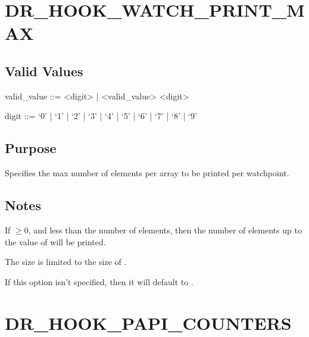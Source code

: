 \documentclass[letterpaper,10pt,english]{sphinxmanual}
\begin{document}
\section{DR\_HOOK\_WATCH\_PRINT\_MAX}
\label{\detokenize{flag/flag:dr-hook-watch-print-max}}\label{\detokenize{flag/flag:id276}}

\subsection{Valid Values}
\label{\detokenize{flag/flag:id277}}
\begin{DUlineblock}{0em}
\item[] valid\_value ::= \textless{}digit\textgreater{} | \textless{}valid\_value\textgreater{} \textless{}digit\textgreater{}
\item[] digit ::= ‘0’ | ‘1’ | ‘2’ | ‘3’ | ‘4’ | ‘5’ | ‘6’ | ‘7’ | ‘8’ | ‘9’
\end{DUlineblock}


\subsection{Purpose}
\label{\detokenize{flag/flag:id278}}
\sphinxAtStartPar
Specifies the max number of elements per array to be printed per watchpoint.


\subsection{Notes}
\label{\detokenize{flag/flag:id279}}
\sphinxAtStartPar
If  \(\geq 0\), and less than the number of elements, then the number of elements up to the value of  will be printed.

\sphinxAtStartPar
The size is limited to the size of .

\sphinxAtStartPar
If this option isn’t specified, then it will default to .


\section{DR\_HOOK\_PAPI\_COUNTERS}
\label{\detokenize{flag/flag:dr-hook-papi-counters}}\label{\detokenize{flag/flag:id281}}
\end{document}
